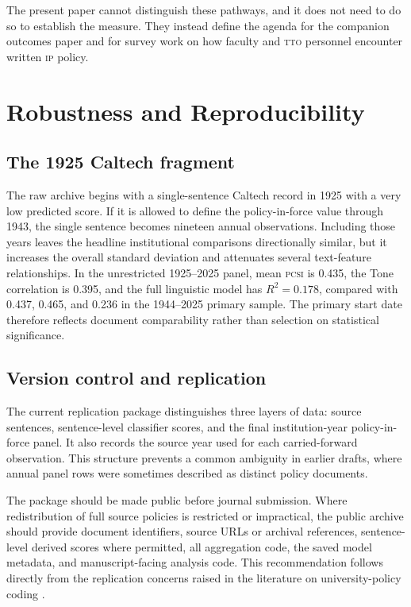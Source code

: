 \documentclass[12pt]{article}
\newcommand{\PCSI}{\textsc{pcsi}}
\newcommand{\IP}{\textsc{ip}}
\newcommand{\TTO}{\textsc{tto}}
\begin{document}
The present paper cannot distinguish these pathways, and it does not need to do so to establish the measure. They instead define the agenda for the companion outcomes paper and for survey work on how faculty and \TTO{} personnel encounter written \IP{} policy.

\section{Robustness and Reproducibility}

\subsection{The 1925 Caltech fragment}

The raw archive begins with a single-sentence Caltech record in 1925 with a very low predicted score. If it is allowed to define the policy-in-force value through 1943, the single sentence becomes nineteen annual observations. Including those years leaves the headline institutional comparisons directionally similar, but it increases the overall standard deviation and attenuates several text-feature relationships. In the unrestricted 1925--2025 panel, mean \PCSI{} is 0.435, the Tone correlation is 0.395, and the full linguistic model has $R^2=0.178$, compared with 0.437, 0.465, and 0.236 in the 1944--2025 primary sample. The primary start date therefore reflects document comparability rather than selection on statistical significance.

\subsection{Version control and replication}

The current replication package distinguishes three layers of data: source sentences, sentence-level classifier scores, and the final institution-year policy-in-force panel. It also records the source year used for each carried-forward observation. This structure prevents a common ambiguity in earlier drafts, where annual panel rows were sometimes described as distinct policy documents.

The package should be made public before journal submission. Where redistribution of full source policies is restricted or impractical, the public archive should provide document identifiers, source URLs or archival references, sentence-level derived scores where permitted, all aggregation code, the saved model metadata, and manuscript-facing analysis code. This recommendation follows directly from the replication concerns raised in the literature on university-policy coding \citep{OuelletteTutt2020}.
\end{document}
